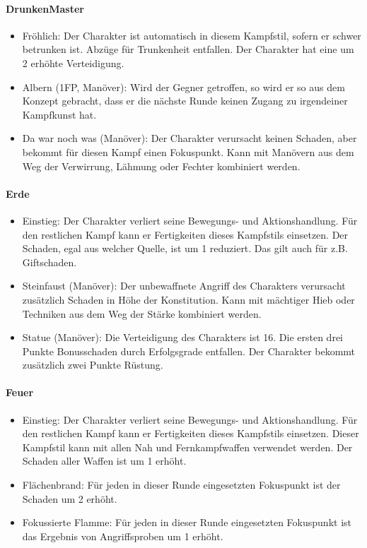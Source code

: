 \documentclass{article}
\begin{document}
\paragraph{DrunkenMaster}

\begin{itemize}
\item Fröhlich: Der Charakter ist automatisch in diesem Kampfstil, sofern er schwer betrunken ist. Abzüge für Trunkenheit entfallen. Der Charakter hat eine um 2 erhöhte Verteidigung.
\item Albern (1FP, Manöver): Wird der Gegner getroffen, so wird er so aus dem Konzept gebracht, dass er die nächste Runde keinen Zugang zu irgendeiner Kampfkunst hat.
\item Da war noch was (Manöver): Der Charakter verursacht keinen Schaden, aber bekommt für diesen Kampf einen Fokuspunkt. Kann mit Manövern aus dem Weg der Verwirrung, Lähmung oder Fechter kombiniert werden.
\end{itemize}

\paragraph{Erde}

\begin{itemize}
\item Einstieg: Der Charakter verliert seine Bewegungs- und Aktionshandlung. Für den restlichen Kampf kann er Fertigkeiten dieses Kampfstils einsetzen. Der Schaden, egal aus welcher Quelle, ist um 1 reduziert. Das gilt auch für z.B. Giftschaden.
\item Steinfaust (Manöver): Der unbewaffnete Angriff des Charakters verursacht zusätzlich Schaden in Höhe der Konstitution. Kann mit mächtiger Hieb oder Techniken aus dem Weg der Stärke kombiniert werden.
\item Statue (Manöver): Die Verteidigung des Charakters ist 16. Die ersten drei Punkte Bonusschaden durch Erfolgsgrade entfallen. Der Charakter bekommt zusätzlich zwei Punkte Rüstung.
\end{itemize}

\paragraph{Feuer}

\begin{itemize}
\item Einstieg: Der Charakter verliert seine Bewegungs- und Aktionshandlung. Für den restlichen Kampf kann er Fertigkeiten dieses Kampfstils einsetzen. Dieser Kampfstil kann mit allen Nah und Fernkampfwaffen verwendet werden. Der Schaden aller Waffen ist um 1 erhöht.
\item Flächenbrand: Für jeden in dieser Runde eingesetzten Fokuspunkt ist der Schaden um 2 erhöht.
\item Fokussierte Flamme: Für jeden in dieser Runde eingesetzten Fokuspunkt ist das Ergebnis von Angriffsproben um 1 erhöht.
\end{itemize}
\end{document}
